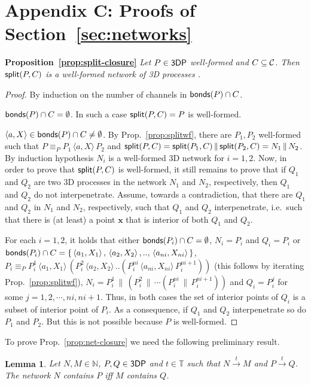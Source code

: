 \documentclass[11pt]{article}
\newcommand{\bonds}{{\sf bonds}}
\newcommand{\Split}{{\sf split}}
\newcommand{\vect}[1]{\mathbf{#1}}
\newcommand{\proc}{\sf{3DP}}
\newcommand{\channels}{{\cal C}}
\newcommand{\unionc}[1]{\,\langle #1 \rangle\,}
\newcommand{\nar}[1]{\xrightarrow{#1}}
\newcommand{\nets}{{\mathbb N}}
\newcommand{\timedomain}{{\mathbb T}}
\newtheorem{lemma}{Lemma}
\begin{document}
\section*{Appendix C: Proofs of Section~\ref{sec:networks}}
\par\medskip\noindent
{\bf Proposition~\ref{prop:split-closure}}
\em Let $P \in \proc$ well-formed and $C \subseteq \channels$. Then $\Split(P,C)$ is
a well-formed network of 3D processes \rm.

\medskip

\begin {proof}
By induction on the number of channels in $\bonds(P) \cap C$.
\par\medskip\noindent
$\bonds(P) \cap C = \emptyset$. In such a case $\Split(P,C) = P$  is  well-formed.
\par\medskip\noindent
$\langle a, X \rangle \in \bonds(P) \cap C \neq \emptyset$. By
Prop.~\ref{prop:splitwf}, there are $P_1, P_2$ well-formed such that $P
\equiv_P P_1 \unionc{a, X} P_2$ and $\Split(P,C) = \Split(P_1, C) \,\|\, \Split(P_2, C) = N_1 \,\|\,
N_2$. By induction hypothesis $N_i$ is a well-formed 3D network for $i=1,2$. Now, in
order to prove that $\Split(P, C)$ is  well-formed, it still remains to prove that if $Q_1$
and $Q_2$ are two 3D processes in the network $N_1$ and $N_2$,  respectively, then $Q_1$ and $Q_2$
do not interpenetrate.
Assume, towards a contradiction, that there are $Q_1$ and $Q_2$ in $N_1$ and $N_2$, respectively,
such that $Q_1$ and $Q_2$ interpenetrate, i.e.\ such that there is (at least) a point $\vect{x}$
that is interior of both $Q_1$ and $Q_2$.

For each $i=1,2$, it holds that either $\bonds(P_i) \cap C = \emptyset$,  $N_i =
P_i$ and $Q_i = P_i$ or $\bonds(P_i) \cap C = \{\unionc{a_1, X_1}, \unionc{a_2, X_2},.. ,
\unionc{a_{ni}, X_{ni}}\}$, $P_i \equiv_P P_i^1 \unionc{a_1, X_1} (P_i^2 \unionc{a_2, X_2} ..
(P_i^{ni} \unionc{a_{ni}, X_{ni}} P_i^{ni + 1}))$ (this follows by iterating\\ 
Prop.~\ref{prop:splitwf}), $N_i = P_i^1 \,\|\, (P_i^2 \,\|\, \cdots (P_i^{ni} \,\|\, P_i^{ni+1}))$
and $Q_i = P_i^j$ for some $j = 1,2, \cdots, ni, ni+1$. Thus, in both cases the set of interior
points of $Q_i$ is a subset of interior point of $P_i$. As a consequence, if
$Q_1$ and $Q_2$ interpenetrate so do $P_1$ and $P_2$. But this is not possible because
$P$ is well-formed.
\end {proof}
To prove Prop.~\ref{prop:net-closure} we need the following preliminary result.
\begin{lemma}\label{lemma:net-time}
Let $N, M \in \nets$, $P, Q \in \proc$ and $t \in \timedomain$ such that $N \nar{t} M$ and $P
\nar{t} Q$. The network $N$ contains $P$ iff $M$ contains $Q$.
\end{lemma}
\end{document}
